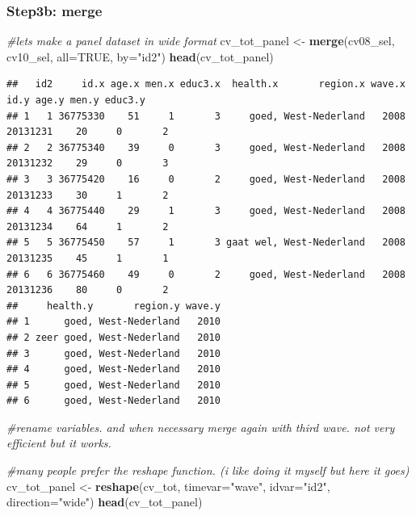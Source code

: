 \documentclass[
]{book}
\newenvironment{Shaded}{\begin{snugshade}}{\end{snugshade}}
\newcommand{\CommentTok}[1]{\textcolor[rgb]{0.56,0.35,0.01}{\textit{#1}}}
\newcommand{\DataTypeTok}[1]{\textcolor[rgb]{0.13,0.29,0.53}{#1}}
\newcommand{\KeywordTok}[1]{\textcolor[rgb]{0.13,0.29,0.53}{\textbf{#1}}}
\newcommand{\NormalTok}[1]{#1}
\newcommand{\OtherTok}[1]{\textcolor[rgb]{0.56,0.35,0.01}{#1}}
\newcommand{\StringTok}[1]{\textcolor[rgb]{0.31,0.60,0.02}{#1}}
\begin{document}
\hypertarget{step3b-merge}{%
\subsubsection{Step3b: merge}\label{step3b-merge}}

\begin{Shaded}
\begin{Highlighting}[numbers=left,,]
\CommentTok{#lets make a panel dataset in wide format}
\NormalTok{cv_tot_panel <-}\StringTok{ }\KeywordTok{merge}\NormalTok{(cv08_sel, cv10_sel, }\DataTypeTok{all=}\OtherTok{TRUE}\NormalTok{, }\DataTypeTok{by=}\StringTok{"id2"}\NormalTok{)}
\KeywordTok{head}\NormalTok{(cv_tot_panel)}
\end{Highlighting}
\end{Shaded}

\begin{verbatim}
##   id2     id.x age.x men.x educ3.x  health.x       region.x wave.x     id.y age.y men.y educ3.y
## 1   1 36775330    51     1       3     goed, West-Nederland   2008 20131231    20     0       2
## 2   2 36775340    39     0       3     goed, West-Nederland   2008 20131232    29     0       3
## 3   3 36775420    16     0       2     goed, West-Nederland   2008 20131233    30     1       2
## 4   4 36775440    29     1       3     goed, West-Nederland   2008 20131234    64     1       2
## 5   5 36775450    57     1       3 gaat wel, West-Nederland   2008 20131235    45     1       1
## 6   6 36775460    49     0       2     goed, West-Nederland   2008 20131236    80     0       2
##     health.y       region.y wave.y
## 1      goed, West-Nederland   2010
## 2 zeer goed, West-Nederland   2010
## 3      goed, West-Nederland   2010
## 4      goed, West-Nederland   2010
## 5      goed, West-Nederland   2010
## 6      goed, West-Nederland   2010
\end{verbatim}

\begin{Shaded}
\begin{Highlighting}[numbers=left,,]
\CommentTok{#rename variables. and when necessary merge again with third wave. not very efficient but it works.}

\CommentTok{#many people prefer the reshape function. (i like doing it myself but here it goes)}
\NormalTok{cv_tot_panel <-}\StringTok{ }\KeywordTok{reshape}\NormalTok{(cv_tot, }\DataTypeTok{timevar=}\StringTok{"wave"}\NormalTok{, }\DataTypeTok{idvar=}\StringTok{"id2"}\NormalTok{, }\DataTypeTok{direction=}\StringTok{"wide"}\NormalTok{)}
\KeywordTok{head}\NormalTok{(cv_tot_panel)}
\end{Highlighting}
\end{Shaded}
\end{document}
